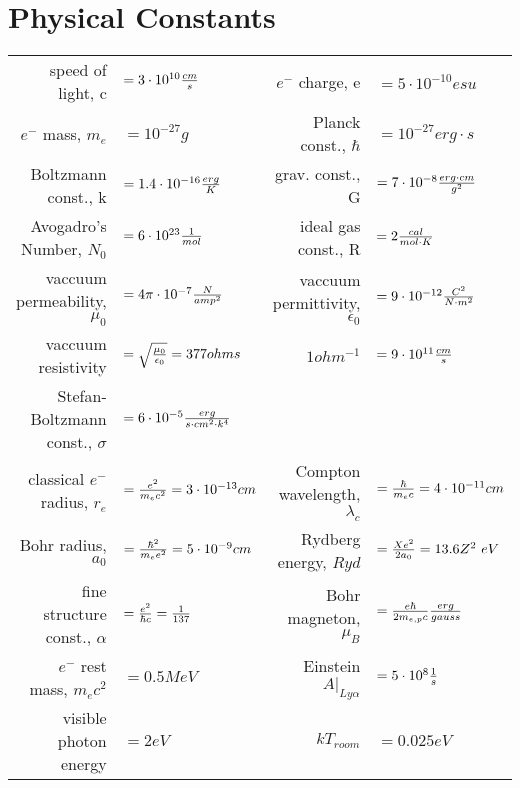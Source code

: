 \documentclass[10pt]{article}
\def\inv#1{{1\over #1}}
\def\e#1{\cdot10^{#1}}
\begin{document}
\section*{Physical Constants}

\begin{table}[h!]\begin{tabular}{|rlrl|}
\hline
speed of light, c &
$=3\e{10}{cm\over s}$ & 
$e^-$ charge, e &
$=5\e{-10}esu$ \\

$e^-$ mass, $m_e$ &
$=10^{-27}g$ & 
Planck const., $\hbar$ &
$=10^{-27}{erg\cdot s}$ \\

Boltzmann const., k &
$=1.4\e{-16}{erg\over K}$ &
grav. const., G &
$=7\e{-8}{erg\cdot cm \over g^2}$ \\

Avogadro's Number, $N_0$ &
$=6\e{23}\inv{mol} $& 
ideal gas const., R &
$=2{cal\over mol\cdot K}$ \\

vaccuum permeability, $\mu_0$ &
$=4\pi\e{-7}{N\over amp^2} $& 
vaccuum permittivity, $\epsilon_0$ &
$=9\e{-12}{C^2\over N\cdot m^2}$ \\

vaccuum resistivity &
$=\sqrt{\mu_0\over \epsilon_0}=377 ohms$ &
$1 ohm^{-1}$ &
$=9\e{11} {cm\over s}$ \\

Stefan-Boltzmann const., $\sigma$ &
$=6\e{-5}{erg\over s\cdot cm^2\cdot k^4}$ &
&
\\

\hline

classical $e^-$ radius, $r_e$ & 
$={e^2\over m_ec^2}=3\e{-13}cm$ &
Compton wavelength, $\lambda_c$ &
$={\hbar\over m_e c}=4\e{-11}cm$ \\

Bohr radius, $a_0$ &
$={\hbar^2\over m_ee^2}=5\e{-9}cm$ &
Rydberg energy, $Ryd$ &
$={Xe^2\over 2a_0}=13.6 Z^2\ eV$ \\

fine structure const., $\alpha$ &
$={e^2\over \hbar c}=\inv{137}$ &
Bohr magneton, $\mu_B$ &
$={e\hbar\over 2m_{e,p}c}{erg\over gauss}$ \\

$e^-$ rest mass, $m_ec^2$ &
$=0.5 MeV$ &
Einstein $A|_{Ly\alpha}$ &
$=5\e8 \inv{s}$ \\

visible photon energy &
$= 2 eV$ &
$kT_{room}$ &
$=0.025 eV$ \\


\end{tabular}
\end{table}
\end{document}
